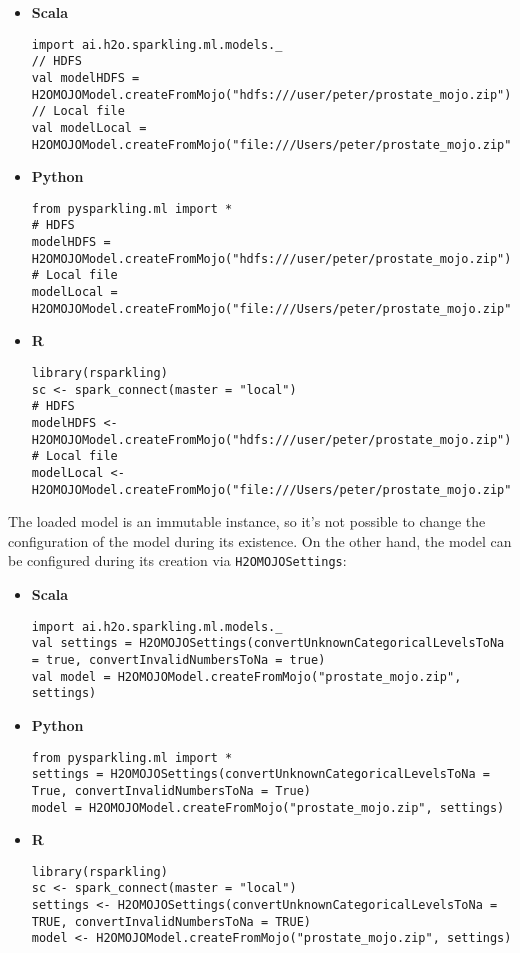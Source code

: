 \begin{itemize}
    \item \textbf{Scala} \begin{lstlisting}[style=Scala]
import ai.h2o.sparkling.ml.models._
// HDFS
val modelHDFS = H2OMOJOModel.createFromMojo("hdfs:///user/peter/prostate_mojo.zip")
// Local file
val modelLocal = H2OMOJOModel.createFromMojo("file:///Users/peter/prostate_mojo.zip")
    \end{lstlisting}
    \item \textbf{Python} \begin{lstlisting}[style=Python]
from pysparkling.ml import *
# HDFS
modelHDFS = H2OMOJOModel.createFromMojo("hdfs:///user/peter/prostate_mojo.zip")
# Local file
modelLocal = H2OMOJOModel.createFromMojo("file:///Users/peter/prostate_mojo.zip")
    \end{lstlisting}
    \item \textbf{R} \begin{lstlisting}[style=R]
library(rsparkling)
sc <- spark_connect(master = "local")
# HDFS
modelHDFS <- H2OMOJOModel.createFromMojo("hdfs:///user/peter/prostate_mojo.zip")
# Local file
modelLocal <- H2OMOJOModel.createFromMojo("file:///Users/peter/prostate_mojo.zip")
    \end{lstlisting}
\end{itemize}


The loaded model is an immutable instance, so it's not possible to change the configuration of the model during its existence.
On the other hand, the model can be configured during its creation via \texttt{H2OMOJOSettings}:

\begin{itemize}
    \item \textbf{Scala} \begin{lstlisting}[style=Scala]
import ai.h2o.sparkling.ml.models._
val settings = H2OMOJOSettings(convertUnknownCategoricalLevelsToNa = true, convertInvalidNumbersToNa = true)
val model = H2OMOJOModel.createFromMojo("prostate_mojo.zip", settings)
    \end{lstlisting}
    \item \textbf{Python} \begin{lstlisting}[style=Python]
from pysparkling.ml import *
settings = H2OMOJOSettings(convertUnknownCategoricalLevelsToNa = True, convertInvalidNumbersToNa = True)
model = H2OMOJOModel.createFromMojo("prostate_mojo.zip", settings)
    \end{lstlisting}
    \item \textbf{R} \begin{lstlisting}[style=R]
library(rsparkling)
sc <- spark_connect(master = "local")
settings <- H2OMOJOSettings(convertUnknownCategoricalLevelsToNa = TRUE, convertInvalidNumbersToNa = TRUE)
model <- H2OMOJOModel.createFromMojo("prostate_mojo.zip", settings)
    \end{lstlisting}
\end{itemize}

